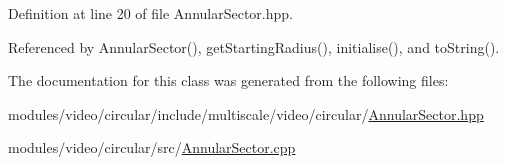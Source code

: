 Definition at line 20 of file Annular\-Sector.\-hpp.



Referenced by Annular\-Sector(), get\-Starting\-Radius(), initialise(), and to\-String().



The documentation for this class was generated from the following files\-:\begin{DoxyCompactItemize}
\item 
modules/video/circular/include/multiscale/video/circular/\hyperlink{AnnularSector_8hpp}{Annular\-Sector.\-hpp}\item 
modules/video/circular/src/\hyperlink{AnnularSector_8cpp}{Annular\-Sector.\-cpp}\end{DoxyCompactItemize}
